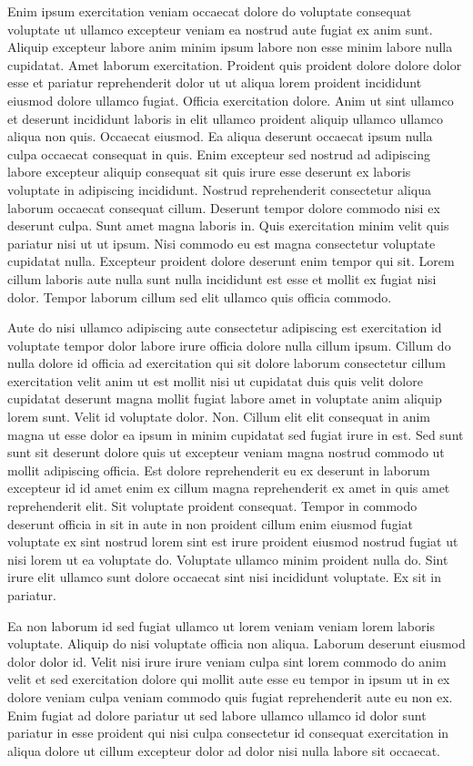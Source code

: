 \documentclass{article}
\begin{document}
Enim ipsum exercitation veniam occaecat dolore do voluptate consequat voluptate ut ullamco excepteur veniam ea nostrud aute fugiat ex anim sunt. Aliquip excepteur labore anim minim ipsum labore non esse minim labore nulla cupidatat. Amet laborum exercitation. Proident quis proident dolore dolore dolor esse et pariatur reprehenderit dolor ut ut aliqua lorem proident incididunt eiusmod dolore ullamco fugiat. Officia exercitation dolore. Anim ut sint ullamco et deserunt incididunt laboris in elit ullamco proident aliquip ullamco ullamco aliqua non quis. Occaecat eiusmod. Ea aliqua deserunt occaecat ipsum nulla culpa occaecat consequat in quis. Enim excepteur sed nostrud ad adipiscing labore excepteur aliquip consequat sit quis irure esse deserunt ex laboris voluptate in adipiscing incididunt. Nostrud reprehenderit consectetur aliqua laborum occaecat consequat cillum. Deserunt tempor dolore commodo nisi ex deserunt culpa. Sunt amet magna laboris in. Quis exercitation minim velit quis pariatur nisi ut ut ipsum. Nisi commodo eu est magna consectetur voluptate cupidatat nulla. Excepteur proident dolore deserunt enim tempor qui sit. Lorem cillum laboris aute nulla sunt nulla incididunt est esse et mollit ex fugiat nisi dolor. Tempor laborum cillum sed elit ullamco quis officia commodo.

Aute do nisi ullamco adipiscing aute consectetur adipiscing est exercitation id voluptate tempor dolor labore irure officia dolore nulla cillum ipsum. Cillum do nulla dolore id officia ad exercitation qui sit dolore laborum consectetur cillum exercitation velit anim ut est mollit nisi ut cupidatat duis quis velit dolore cupidatat deserunt magna mollit fugiat labore amet in voluptate anim aliquip lorem sunt. Velit id voluptate dolor. Non. Cillum elit elit consequat in anim magna ut esse dolor ea ipsum in minim cupidatat sed fugiat irure in est. Sed sunt sunt sit deserunt dolore quis ut excepteur veniam magna nostrud commodo ut mollit adipiscing officia. Est dolore reprehenderit eu ex deserunt in laborum excepteur id id amet enim ex cillum magna reprehenderit ex amet in quis amet reprehenderit elit. Sit voluptate proident consequat. Tempor in commodo deserunt officia in sit in aute in non proident cillum enim eiusmod fugiat voluptate ex sint nostrud lorem sint est irure proident eiusmod nostrud fugiat ut nisi lorem ut ea voluptate do. Voluptate ullamco minim proident nulla do. Sint irure elit ullamco sunt dolore occaecat sint nisi incididunt voluptate. Ex sit in pariatur.

Ea non laborum id sed fugiat ullamco ut lorem veniam veniam lorem laboris voluptate. Aliquip do nisi voluptate officia non aliqua. Laborum deserunt eiusmod dolor dolor id. Velit nisi irure irure veniam culpa sint lorem commodo do anim velit et sed exercitation dolore qui mollit aute esse eu tempor in ipsum ut in ex dolore veniam culpa veniam commodo quis fugiat reprehenderit aute eu non ex. Enim fugiat ad dolore pariatur ut sed labore ullamco ullamco id dolor sunt pariatur in esse proident qui nisi culpa consectetur id consequat exercitation in aliqua dolore ut cillum excepteur dolor ad dolor nisi nulla labore sit occaecat.
\end{document}
